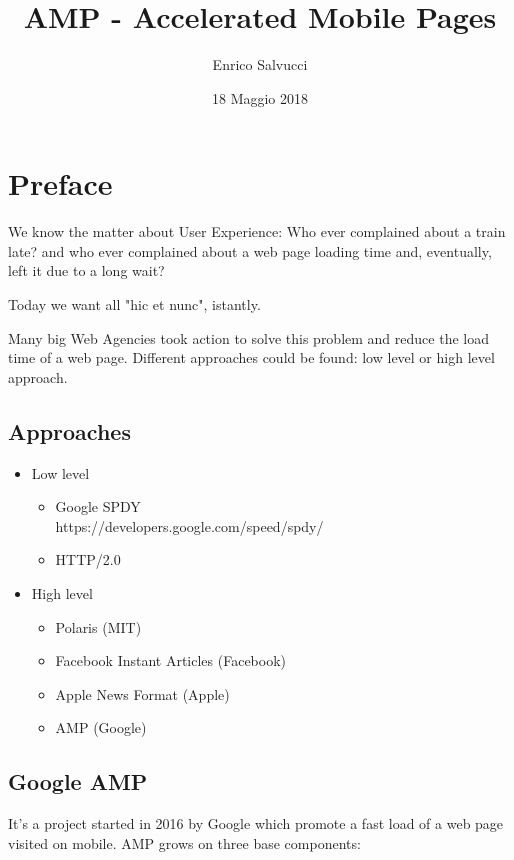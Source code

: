 \documentclass[a4paper]{article}
\title{AMP - Accelerated Mobile Pages}
\author{Enrico Salvucci}
\date{18 Maggio 2018}
\begin{document}
\maketitle

\newpage

\tableofcontents

\newpage
\section{Preface}

We know the matter about User Experience: Who ever complained about a train late? and who ever complained about a web page loading time and, eventually, left it due to a long wait?

Today we want all "hic et nunc", istantly.

Many big Web Agencies took action to solve this problem and reduce the load time of a web page. Different approaches could be found: low level or high level approach.

\subsection{Approaches}
\begin{itemize}
    \item Low level
    \begin{itemize}
        \item Google SPDY\\
        https://developers.google.com/speed/spdy/
        \item HTTP/2.0
    \end{itemize}

    \item High level
    \begin{itemize}
        \item Polaris (MIT)
        \item Facebook Instant Articles (Facebook)\\
        \item Apple News Format (Apple)
        \item AMP (Google)
    \end{itemize}
\end{itemize}

\newpage
\subsection{Google AMP}
It's a project started in 2016 by Google which promote a fast load of a web page visited on mobile.
AMP grows on three base components:
\end{document}
